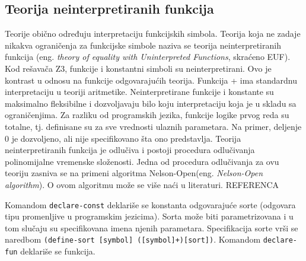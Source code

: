 \documentclass[12pt,oneside]{memoir}
\begin{document}
\subsection{Teorija neinterpretiranih funkcija}
Teorije obično određuju interpretaciju funkcijskih simbola. Teorija koja ne zadaje nikakva ograničenja za funkcijske simbole naziva se teorija neinterpretiranih funkcija 
(eng. \textit{theory of equality with Uninterpreted Functions}, skraćeno EUF). Kod rešavača Z3, funkcije i konstantni simboli su neinterpretirani. Ovo je kontrast u odnosu na funkcije odgovarajućih teorija. Funkcija + ima standardnu interpretaciju u teoriji aritmetike. Neinterpretirane funkcije i konstante su maksimalno fleksibilne i dozvoljavaju bilo koju interpretaciju koja je u skladu sa ograničenjima. Za razliku od programskih jezika, funkcije logike prvog reda su totalne, tj. definisane su za sve vrednosti ulaznih parametara. Na primer, deljenje 0 je dozvoljeno, ali nije specifikovano šta ono predstavlja. Teorija neinterpretiranih funkcija je odlučiva i postoji procedura odlučivanja polinomijalne vremenske složenosti. Jedna od procedura odlučivanja za ovu teoriju zasniva se na primeni algoritma Nelson-Open(eng. \textit{Nelson-Open algorithm}). O ovom algoritmu može se više naći u literaturi. REFERENCA
\par

Komandom \texttt{declare-const} deklariše se konstanta odgovarajuće sorte (odgovara tipu promenljive u programskim jezicima). Sorta može biti parametrizovana i u tom slučaju su specifikovana imena njenih parametara. Specifikacija sorte vrši se naredbom \texttt{(define-sort [symbol] ([symbol]+)[sort])}.
Komandom \texttt{declare-fun} deklariše se funkcija. 
\end{document}
